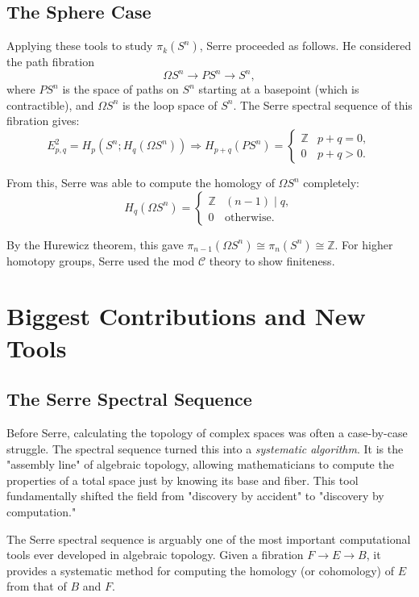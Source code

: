 \subsection{The Sphere Case}

Applying these tools to study $\pi_k(S^n)$, Serre proceeded as follows. He considered the path fibration
\[
\Omega S^n \to P S^n \to S^n,
\]
where $P S^n$ is the space of paths on $S^n$ starting at a basepoint (which is contractible), and $\Omega S^n$ is the loop space of $S^n$. The Serre spectral sequence of this fibration gives:
\[
E^2_{p,q} = H_p(S^n; H_q(\Omega S^n)) \Longrightarrow H_{p+q}(P S^n) = 
\begin{cases}
\mathbb{Z} & p+q = 0, \\
0 & p+q > 0.
\end{cases}
\]

From this, Serre was able to compute the homology of $\Omega S^n$ completely:
\[
H_q(\Omega S^n) = 
\begin{cases}
\mathbb{Z} & (n-1) \mid q, \\
0 & \text{otherwise}.
\end{cases}
\]

By the Hurewicz theorem, this gave $\pi_{n-1}(\Omega S^n) \cong \pi_n(S^n) \cong \mathbb{Z}$. For higher homotopy groups, Serre used the mod $\mathcal{C}$ theory to show finiteness.

\section{Biggest Contributions and New Tools}

\subsection{The Serre Spectral Sequence}

\begin{whyitmatters}
Before Serre, calculating the topology of complex spaces was often a case-by-case struggle. The spectral sequence turned this into a \emph{systematic algorithm}. It is the "assembly line" of algebraic topology, allowing mathematicians to compute the properties of a total space just by knowing its base and fiber. This tool fundamentally shifted the field from "discovery by accident" to "discovery by computation."
\end{whyitmatters}

The Serre spectral sequence is arguably one of the most important computational tools ever developed in algebraic topology. Given a fibration $F \to E \to B$, it provides a systematic method for computing the homology (or cohomology) of $E$ from that of $B$ and $F$.


